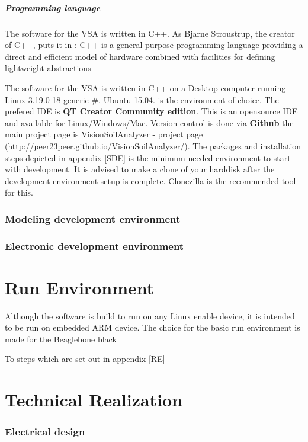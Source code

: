 \documentclass[11pt,fleqn,,a4paper,twoside,openright]{book}
\begin{document}
\paragraph{Programming language}
The software for the VSA is written in C++. As Bjarne Stroustrup, the creator of C++, puts it in \cite{_c++_2013} : C++ is a general-purpose programming language providing a direct and efficient model of hardware combined with facilities for defining lightweight abstractions

The software for the VSA is written in C++ on a Desktop computer running Linux 3.19.0-18-generic \#. Ubuntu 15.04.   is the environment of choice. The prefered IDE is \textbf{QT Creator Community edition}. This is an opensource IDE and available for Linux/Windows/Mac. Version control is done via \textbf{Github} the main project page is VisionSoilAnalyzer - project page (\url{http://peer23peer.github.io/VisionSoilAnalyzer/}). The packages and installation steps depicted in appendix \ref{SDE} is the minimum needed environment to start with development. It is advised to make a clone of your harddisk after the development environment setup is complete. Clonezilla is the recommended tool for this. 

\subsection{Modeling development environment}

\subsection{Electronic development environment}

\chapter{Run Environment}
Although the software is build to run on any Linux enable device, it is intended to be run on embedded ARM device. The choice for the basic run environment is made for the Beaglebone black

To steps which are set out in appendix \ref{RE}

\chapter{Technical Realization}

\subsection{Electrical design}
\end{document}
